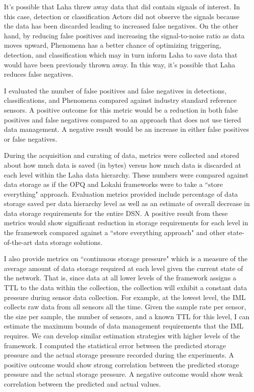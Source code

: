 It's possible that Laha threw away data that did contain signals of interest. In this case, detection or classification Actors did not observe the signals because the data has been discarded leading to increased false negatives. On the other hand, by reducing false positives and increasing the signal-to-noise ratio as data moves upward, Phenomena has a better chance of optimizing triggering, detection, and classification which may in turn inform Laha to save data that would have been previously thrown away. In this way, it's possible that Laha reduces false negatives.

I evaluated the number of false positives and false negatives in detections, classifications, and Phenomena compared against industry standard reference sensors. A positive outcome for this metric would be a reduction in both false positives and false negatives compared to an approach that does not use tiered data management. A negative result would be an increase in either false positives or false negatives. 

During the acquisition and curating of data, metrics were collected and stored about how much data is saved (in bytes) versus how much data is discarded at each level within the Laha data hierarchy. These numbers were compared against data storage as if the OPQ and Lokahi frameworks were to take a ``store everything" approach. Evaluation metrics provided include percentage of data storage saved per data hierarchy level as well as an estimate of overall decrease in data storage requirements for the entire DSN. A positive result from these metrics would show significant reduction in storage requirements for each level in the framework compared against a ``store everything approach" and other state-of-the-art data storage solutions.

I also provide metrics on ``continuous storage pressure" which is a measure of the average amount of data storage required at each level given the current state of the network. That is, since data at all lower levels of the framework assigns a TTL to the data within the collection, the collection will exhibit a constant data pressure during sensor data collection. For example, at the lowest level, the IML collects raw data from all sensors all the time. Given the sample rate per sensor, the size per sample, the number of sensors, and a known TTL for this level, I can estimate the maximum bounds of data management requirements that the IML requires. We can develop similar estimation strategies with higher levels of the framework. I computed the statistical error between the predicted storage pressure and the actual storage pressure recorded during the experiments. A positive outcome would show strong correlation between the predicted storage pressure and the actual storage pressure. A negative outcome would show weak correlation between the predicted and actual values.

